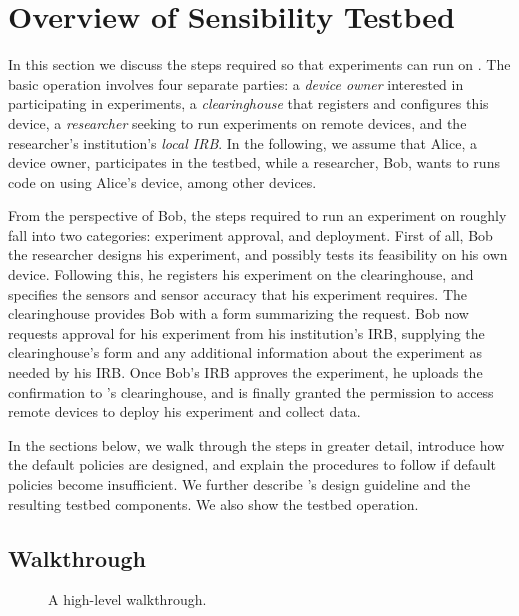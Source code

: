 \section{Overview of Sensibility Testbed}\label{sec-overview}

In this section we discuss the steps required so that experiments 
can run on \sysname. The basic operation involves four separate 
parties: a \textit{device owner} interested in participating in 
experiments, a \textit{clearinghouse} that registers and configures 
this device,  a \textit{researcher} seeking to run experiments on 
remote devices, and the researcher's institution's \textit{local IRB}.
In the following, we assume that Alice, a device owner, participates in 
the testbed, while a researcher, Bob, wants to runs code on \sysname 
using Alice's device, among other devices.

From the perspective of Bob, the steps required to 
run an experiment on \sysname roughly fall into two categories: 
experiment approval, and deployment.
First of all, Bob the researcher designs his experiment, and 
possibly tests its feasibility on his own device. Following this, 
he registers his experiment on the \sysname clearinghouse, and 
specifies the sensors and sensor accuracy that his experiment 
requires. The clearinghouse provides Bob with a form summarizing 
the request. Bob now requests approval for his experiment from his 
institution's IRB, supplying the clearinghouse's form and any 
additional information about the experiment as needed by his IRB. 
Once Bob's IRB approves the experiment, he uploads the confirmation 
to \sysname's clearinghouse, and is finally granted the permission 
to access remote devices to deploy his experiment and collect data.

In the sections below, we walk through the steps in greater detail, 
introduce how the default policies are designed, and explain the 
procedures to follow if default policies become insufficient. 
We further describe \sysname's design guideline 
and the resulting testbed components. We also show the testbed operation.


\subsection{Walkthrough}\label{sec-walkthrough}

\begin{figure}
\caption{\small A high-level walkthrough. \label{fig-walkthrough}}
\end{figure}

